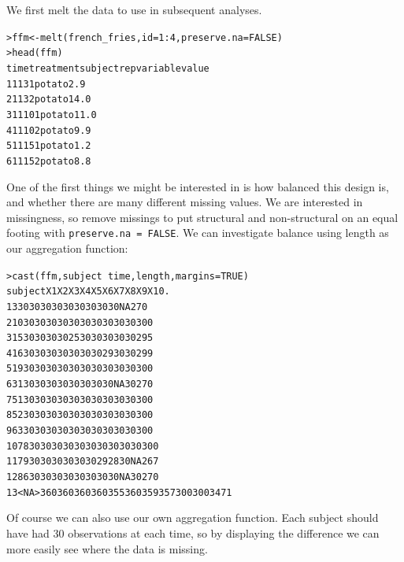 \documentclass[oneside,letterpaper]{scrartcl}
\begin{document}
We first melt the data to use in subsequent analyses.  

\begin{alltt}
> ffm <- melt(french_fries, id = 1:4, preserve.na = FALSE)
> head(ffm)
  time treatment subject rep variable value
1    1         1       3   1   potato   2.9
2    1         1       3   2   potato  14.0
3    1         1      10   1   potato  11.0
4    1         1      10   2   potato   9.9
5    1         1      15   1   potato   1.2
6    1         1      15   2   potato   8.8

\end{alltt}

One of the first things we might be interested in is how balanced this design is, and whether there are many different missing values.  We are interested in missingness, so remove missings to put structural and non-structural on an equal footing with {\tt preserve.na = FALSE}.   We can investigate balance using length as our aggregation function:

\begin{alltt}
> cast(ffm, subject ~ time, length, margins = TRUE)
   subject  X1  X2  X3  X4  X5  X6  X7  X8  X9 X10    .
1        3  30  30  30  30  30  30  30  30  30  NA  270
2       10  30  30  30  30  30  30  30  30  30  30  300
3       15  30  30  30  30  25  30  30  30  30  30  295
4       16  30  30  30  30  30  30  30  29  30  30  299
5       19  30  30  30  30  30  30  30  30  30  30  300
6       31  30  30  30  30  30  30  30  30  NA  30  270
7       51  30  30  30  30  30  30  30  30  30  30  300
8       52  30  30  30  30  30  30  30  30  30  30  300
9       63  30  30  30  30  30  30  30  30  30  30  300
10      78  30  30  30  30  30  30  30  30  30  30  300
11      79  30  30  30  30  30  30  29  28  30  NA  267
12      86  30  30  30  30  30  30  30  30  NA  30  270
13    <NA> 360 360 360 360 355 360 359 357 300 300 3471

\end{alltt}

Of course we can also use our own aggregation function.  Each subject should have had 30 observations at each time, so by displaying the difference we can more easily see where the data is missing.
\end{document}
